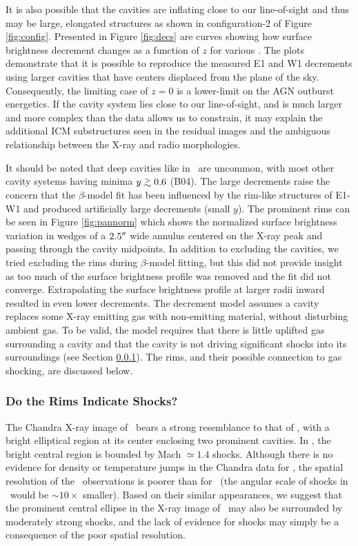 \documentclass[iop]{emulateapj}
\begin{document}
It is also possible that the cavities are inflating close to our
line-of-sight and thus may be large, elongated structures as shown in
configuration-2 of Figure \ref{fig:config}. Presented in Figure
\ref{fig:decs} are curves showing how surface brightness decrement
changes as a function of $z$ for various \rlos. The plots demonstrate
that it is possible to reproduce the measured E1 and W1 decrements
using larger cavities that have centers displaced from the plane of
the sky. Consequently, the limiting case of $z = 0$ is a lower-limit
on the AGN outburst energetics. If the cavity system lies close to our
line-of-sight, and is much larger and more complex than the data
allows us to constrain, it may explain the additional ICM
substructures seen in the residual images and the ambiguous
relationship between the X-ray and radio morphologies.

It should be noted that deep cavities like in \rbs\ are uncommon, with
most other cavity systems having minima $y \ga 0.6$ (B04). The large
decrements raise the concern that the $\beta$-model fit has been
influenced by the rim-like structures of E1-W1 and produced
artificially large decrements (small $y$). The prominent rims can be
seen in Figure \ref{fig:pannorm} which shows the normalized surface
brightness variation in wedges of a $2.5\rm{^\prime}\hskip -0.1em\rm{^\prime}$ wide annulus centered
on the X-ray peak and passing through the cavity midpoints. In
addition to excluding the cavities, we tried excluding the rims during
$\beta$-model fitting, but this did not provide insight as too much of
the surface brightness profile was removed and the fit did not
converge. Extrapolating the surface brightness profile at larger radii
inward resulted in even lower decrements. The \citet{hydraa} decrement
model assumes a cavity replaces some X-ray emitting gas with
non-emitting material, without disturbing ambient gas. To be valid,
the model requires that there is little uplifted gas surrounding a
cavity \citep[\cf][]{2005ApJ...628..629N, 2001ApJ...558L..15B} and
that the cavity is not driving significant shocks into its
surroundings (see Section \ref{sec:shocks}). The rims, and their
possible connection to gas shocking, are discussed below.

\subsubsection{Do the Rims Indicate Shocks?}
\label{sec:shocks}

The Chandra X-ray image of \rbs\ bears a strong resemblance to that of
\ms, with a bright elliptical region at its center enclosing two
prominent cavities. In \ms, the bright central region is bounded by
Mach $\simeq 1.4$ shocks. Although there is no evidence for density or
temperature jumps in the Chandra data for \rbs, the spatial resolution
of the \rbs\ observations is poorer than for \ms\ (the angular scale
of shocks in \rbs\ would be $\sim 10\times$ smaller). Based on their
similar appearances, we suggest that the prominent central ellipse in
the X-ray image of \rbs\ may also be surrounded by moderately strong
shocks, and the lack of evidence for shocks may simply be a
consequence of the poor spatial resolution.
\end{document}
